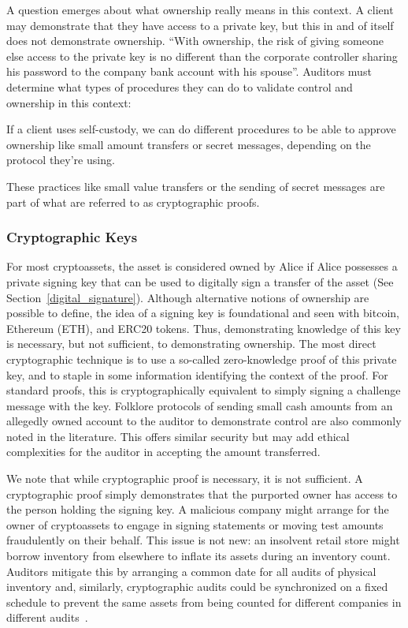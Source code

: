 A question emerges about what ownership really means in this context. A client may demonstrate that they have access to a private key, but this in and of itself does not demonstrate ownership. ``With ownership, the risk of giving someone else access to the private key is no different than the corporate controller sharing his password to the company bank account with his spouse''. Auditors must determine what types of procedures they can do to validate control and ownership in this context: 

If a client uses self-custody, we can do different procedures to be able to approve ownership like small amount transfers or secret messages, depending on the protocol they're using. 

These practices like small value transfers or the sending of secret messages are part of what are referred to as cryptographic proofs. 

\subsubsection{Cryptographic Keys} 

For most cryptoassets, the asset is considered owned by Alice if Alice possesses a private signing key that can be used to digitally sign a transfer of the asset (See Section~\ref{digital_signature}). Although alternative notions of ownership are possible to define, the idea of a signing key is foundational and seen with bitcoin, Ethereum (ETH), and ERC20 tokens. Thus, demonstrating knowledge of this key is necessary, but not sufficient, to demonstrating ownership. The most direct cryptographic technique is to use a so-called zero-knowledge proof of this private key, and to staple in some information identifying the context of the proof. For standard proofs, this is cryptographically equivalent to simply signing a challenge message with the key. Folklore protocols of sending small cash amounts from an allegedly owned account to the auditor to demonstrate control are also commonly noted in the literature. This offers similar security but may add ethical complexities for the auditor in accepting the amount transferred. 

We note that while cryptographic proof is necessary, it is not sufficient. A cryptographic proof simply demonstrates that the purported owner has access to the person holding the signing key. A malicious company might arrange for the owner of cryptoassets to engage in signing statements or moving test amounts fraudulently on their behalf. This issue is not new: an insolvent retail store might borrow inventory from elsewhere to inflate its assets during an inventory count. Auditors mitigate this by arranging a common date for all audits of physical inventory and, similarly, cryptographic audits could be synchronized on a fixed schedule to prevent the same assets from being counted for different companies in different audits~\cite{dagher2015provisions}. 

